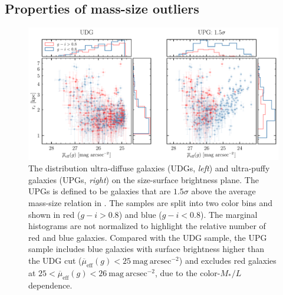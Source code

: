 \documentclass[twocolumn,astrosymb,twocolappendix]{aastex631}
\newcommand{\sbunit}{\mathrm{mag\ arcsec}^{-2}}
\newcommand{\sbeff}{\overline{\mu}_{\mathrm{eff}}(g)}
\begin{document}
\begin{CJK*}{UTF8}{gbsn}
\subsection{Properties of mass-size outliers}\label{sec:mass-size}
\begin{figure}
	\vbox{ 
		\centering
		\includegraphics[width=1\linewidth]{udg_upg_sample.pdf}
	}
    \caption{The distribution ultra-diffuse galaxies (UDGs, \textit{left}) and ultra-puffy galaxies (UPGs, \textit{right}) on the size-surface brightness plane. The UPGs is defined to be galaxies that are $1.5\sigma$ above the average mass-size relation in \citet{ELVES-I}. The samples are split into two color bins and shown in red ($g-i>0.8$) and blue ($g-i<0.8$). The marginal histograms are not normalized to highlight the relative number of red and blue galaxies. Compared with the UDG sample, the UPG sample includes blue galaxies with surface brightness higher than the UDG cut ($\sbeff < 25\ \sbunit$) and excludes red galaxies at $25 < \sbeff < 26\ \sbunit$, due to the color-$M_*/L$ dependence.
    }
    \label{fig:udg_upg_re_mu}
\end{figure}


\end{CJK*}
\end{document}
